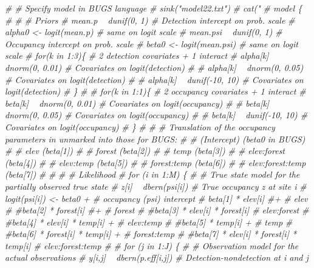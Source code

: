 \documentclass[]{book}
\newenvironment{Shaded}{\begin{snugshade}}{\end{snugshade}}
\newcommand{\CommentTok}[1]{\textcolor[rgb]{0.56,0.35,0.01}{\textit{{#1}}}}
\begin{document}
\begin{Shaded}
\begin{Highlighting}[]
\CommentTok{# # Specify model in BUGS language}
\CommentTok{# sink("model22.txt")}
\CommentTok{# cat("}
\CommentTok{# model \{}
\CommentTok{# }
\CommentTok{# # Priors}
\CommentTok{# mean.p ~ dunif(0, 1)        # Detection intercept on prob. scale}
\CommentTok{# alpha0 <- logit(mean.p)     # same on logit scale}
\CommentTok{# mean.psi ~ dunif(0, 1)      # Occupancy intercept on prob. scale}
\CommentTok{# beta0 <- logit(mean.psi)    # same on logit scale}
\CommentTok{# for(k in 1:3)\{              # 2 detection covariates + 1 interact}
\CommentTok{#     alpha[k] ~ dnorm(0, 0.01) # Covariates on logit(detection)}
\CommentTok{# #   alpha[k] ~ dnorm(0, 0.05) # Covariates on logit(detection)}
\CommentTok{# #   alpha[k] ~ dunif(-10, 10) # Covariates on logit(detection)}
\CommentTok{# \}}
\CommentTok{# }
\CommentTok{# for(k in 1:1)\{                # 2 occupancy covariates + 1 interact}
\CommentTok{#     beta[k] ~ dnorm(0, 0.01)  # Covariates on logit(occupancy)}
\CommentTok{# #   beta[k] ~ dnorm(0, 0.05)  # Covariates on logit(occupancy)}
\CommentTok{# #   beta[k] ~ dunif(-10, 10)  # Covariates on logit(occupancy)}
\CommentTok{# \}}
\CommentTok{# }
\CommentTok{# # Translation of the occupancy parameters in unmarked into those for BUGS:}
\CommentTok{# # (Intercept)         (beta0 in BUGS)}
\CommentTok{# # elev                (beta[1])}
\CommentTok{# # forest              (beta[2])}
\CommentTok{# # temp                (beta[3])}
\CommentTok{# # elev:forest         (beta[4])}
\CommentTok{# # elev:temp           (beta[5])}
\CommentTok{# # forest:temp         (beta[6])}
\CommentTok{# # elev:forest:temp    (beta[7])}
\CommentTok{# }
\CommentTok{# }
\CommentTok{# # Likelihood}
\CommentTok{# for (i in 1:M) \{}
\CommentTok{#   # True state model for the partially observed true state}
\CommentTok{#   z[i] ~ dbern(psi[i])                      # True occupancy z at site i}
\CommentTok{#   logit(psi[i]) <- beta0 +                  # occupancy (psi) intercept}
\CommentTok{#     beta[1] * elev[i] #+                     # elev}
\CommentTok{#     #beta[2] * forest[i] #+                  # forest}
\CommentTok{#     #beta[3] * elev[i] * forest[i]          # elev:forest}
\CommentTok{#     #beta[4] * elev[i] * temp[i] +          # elev:temp}
\CommentTok{#     #beta[5] * temp[i] +                    # temp}
\CommentTok{#     #beta[6] * forest[i] * temp[i] +        # forest:temp}
\CommentTok{#     #beta[7] * elev[i] * forest[i] * temp[i]   # elev:forest:temp}
\CommentTok{# }
\CommentTok{#    for (j in 1:J) \{}
\CommentTok{#       # Observation model for the actual observations}
\CommentTok{#       y[i,j] ~ dbern(p.eff[i,j])      # Detection-nondetection at i and j}

\end{Highlighting}
\end{Shaded}
\end{document}
